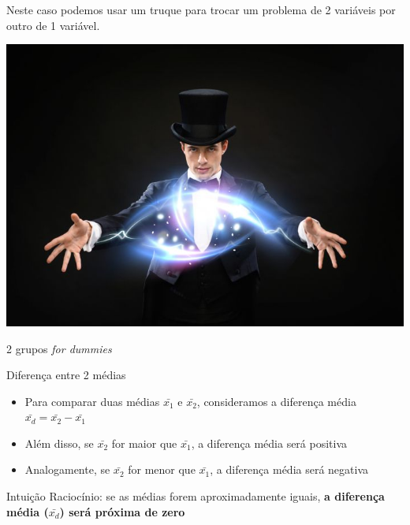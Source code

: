 \documentclass{beamer}
\begin{document}
\begin{frame}{}
  \begin{block}{}
    \large
    Neste caso podemos usar um truque para \alert{trocar} um problema de 2 variáveis por outro de 1 variável.
  \end{block}
  \bigskip
  \bigskip
  \begin{center}
    \includegraphics[width=.6\textwidth]{Cap7/magic}
  \end{center}
\end{frame}

\begin{frame}{2 grupos {\em for dummies}}
  \begin{block}{Diferença entre 2 médias}
    \begin{itemize}
    \item Para comparar duas médias $\bar{x_1}$ e $\bar{x_2}$, consideramos a diferença média $\bar{x_d} = \bar{x_2} - \bar{x_1}$
    \item Além disso, se $\bar{x_2}$ for maior que $\bar{x_1}$, a diferença média será positiva
    \item Analogamente, se $\bar{x_2}$ for menor que $\bar{x_1}$, a diferença média será negativa
    \end{itemize}
  \end{block}
  \begin{block}{Intuição}
    Raciocínio: se as médias forem aproximadamente iguais, {\bf a
    diferença média ($\bar{x_d}$) será próxima de zero}
  \end{block}
\end{frame}
\end{document}
